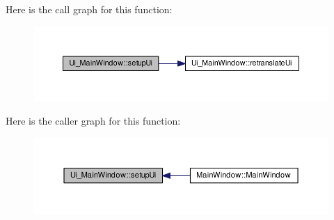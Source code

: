Here is the call graph for this function\-:\nopagebreak
\begin{figure}[H]
\begin{center}
\leavevmode
\includegraphics[width=350pt]{class_ui___main_window_acf4a0872c4c77d8f43a2ec66ed849b58_cgraph}
\end{center}
\end{figure}




Here is the caller graph for this function\-:
\nopagebreak
\begin{figure}[H]
\begin{center}
\leavevmode
\includegraphics[width=350pt]{class_ui___main_window_acf4a0872c4c77d8f43a2ec66ed849b58_icgraph}
\end{center}
\end{figure}




